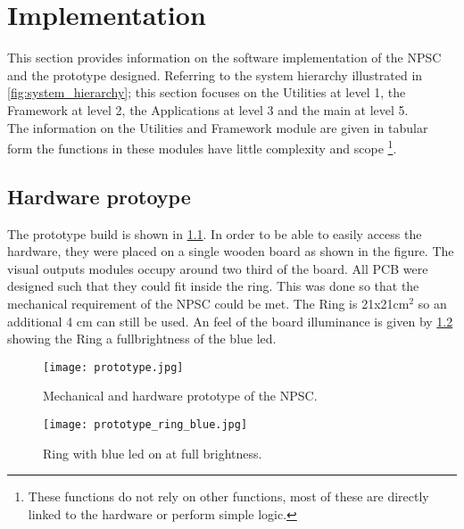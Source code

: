 \chapter{Implementation}
This section provides information on the software implementation of the NPSC and the prototype designed. Referring to the system hierarchy illustrated in \cref{fig:system_hierarchy}; this section focuses on the Utilities at level 1, the Framework at level 2, the Applications at level 3 and the main at level 5.\\
The information on the Utilities and Framework module are given in tabular form the functions in these modules have little complexity and scope \footnote{These functions do not rely on other functions, most of these are directly linked to the hardware or perform simple logic.}. 
   
\section{Hardware protoype}
The prototype build is shown in \cref{fig:prototype}. In order to be able to easily access the hardware, they were placed on a single wooden board as shown in the figure. The visual outputs modules occupy around two third of the board. All PCB were designed such that they could fit inside the ring. This was done so that the mechanical requirement of the NPSC could be met. The Ring is 21x21cm$^2$ so an additional 4 cm can still be used. An feel of the board illuminance is given by \cref{fig:prototype_ring_blue} showing the Ring a fullbrightness of the blue led. 
\begin{figure}[ht]
	\centering
	\texttt{[image: prototype.jpg]}
	\caption{Mechanical and hardware prototype of the NPSC.}
	\label{fig:prototype}
\end{figure}
\begin{figure}[ht]
	\centering
	\texttt{[image: prototype\_ring\_blue.jpg]}
	\caption{Ring with blue led on at full brightness.}
	\label{fig:prototype_ring_blue}
\end{figure}  
